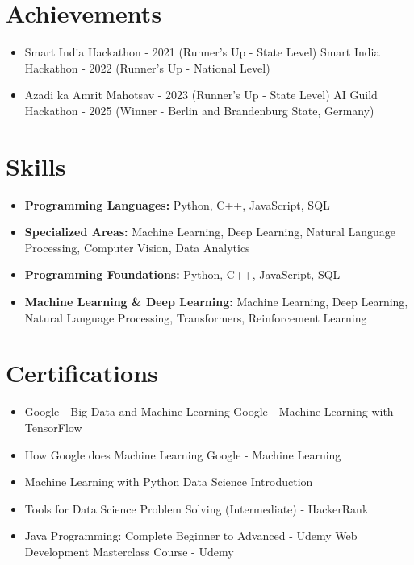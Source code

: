 \documentclass[a4paper,10pt]{article}
\begin{document}
\section*{Achievements}
\begin{itemize}
\item Smart India Hackathon - 2021 (Runner's Up - State Level) \hfill Smart India Hackathon - 2022 (Runner's Up - National Level)
\item Azadi ka Amrit Mahotsav - 2023 (Runner's Up - State Level) \hfill AI Guild Hackathon - 2025 (Winner - Berlin and Brandenburg State, Germany)
\end{itemize}

\section*{Skills}
\begin{itemize}
  \item \textbf{Programming Languages:} Python, C++, JavaScript, SQL
  \item \textbf{Specialized Areas:} Machine Learning, Deep Learning, Natural Language Processing, Computer Vision, Data Analytics
  \item \textbf{Programming Foundations:} Python, C++, JavaScript, SQL
  \item \textbf{Machine Learning \& Deep Learning:} Machine Learning, Deep Learning, Natural Language Processing, Transformers, Reinforcement Learning
\end{itemize}

\section*{Certifications}
\begin{itemize}
\item Google - Big Data and Machine Learning \hfill Google - Machine Learning with TensorFlow
\item How Google does Machine Learning \hfill Google - Machine Learning
\item Machine Learning with Python \hfill Data Science Introduction
\item Tools for Data Science \hfill Problem Solving (Intermediate) - HackerRank
\item Java Programming: Complete Beginner to Advanced - Udemy \hfill Web Development Masterclass Course - Udemy
\end{itemize}
\end{document}
